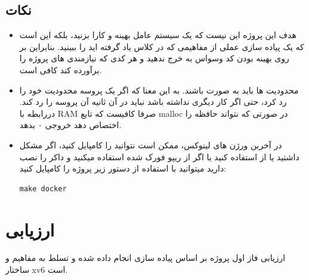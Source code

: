 \documentclass{article}
\begin{document}
		
		\subsection{نکات}
		\begin{itemize}
	
			\item 
			هدف این پروژه این نیست که یک سیستم عامل بهینه و کارا بزنید،  بلکه این است که یک پیاده سازی عملی از مفاهیمی که در کلاس یاد گرفته اید را ببینید. بنابراین بر روی بهینه بودن کد وسواس به خرج ندهید و هر کدی که نیازمندی های پروژه را برآورده کند کافی است.
			\item 
			محدودیت ها باید به صورت 
			باشند. به این معنا که اگر یک پروسه محدودیت خود را رد کرد، حتی اگر  کار دیگری نداشته باشد نباید در آن ثانیه آن پروسه را رد کند. دررابطه با RAM صرفا کافیست که تابع malloc در صورتی که نتواند حافظه را اختصاص دهد خروجی ۰ بدهد.
			
			\item 
			در آخرین ورژن های لینوکس، ممکن است نتوانید  را کامپایل کنید، اگر مشکل داشتید یا از  استفاده کنید یا اگر از ریپو فورک شده استفاده میکنید و داکر را نصب دارید میتوانید با استفاده از دستور زیر پروژه را کامپایل کنید:
			\begin{verbatim}
make docker
			\end{verbatim}
			
		\end{itemize}
		
		\section{ارزیابی}
	 ارزیابی فاز اول پروژه بر اساس پیاده سازی انجام داده شده و تسلط به مفاهیم و ساختار xv6 است.		
	
\end{document}
